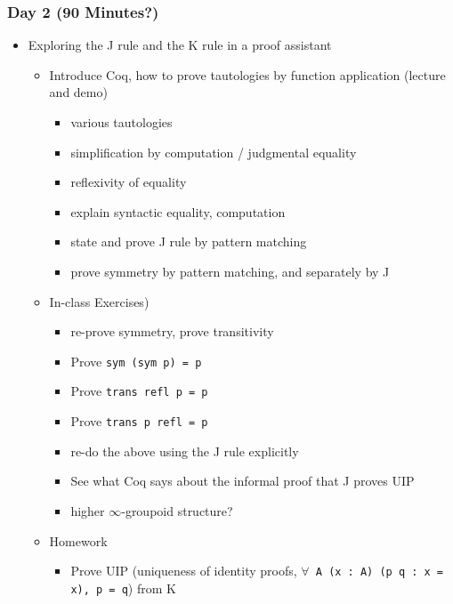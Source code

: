 \documentclass{article}
\begin{document}
\subsubsection*{Day 2 (90 Minutes?)}
\begin{itemize}
  \item Exploring the J rule and the K rule in a proof assistant
    \begin{itemize}
      \item Introduce Coq, how to prove tautologies by function application (lecture and demo)
      \begin{itemize}
        \item various tautologies
        \item simplification by computation / judgmental equality
        \item reflexivity of equality
        \item explain syntactic equality, computation
        \item state and prove J rule by pattern matching
        \item prove symmetry by pattern matching, and separately by J
      \end{itemize}
      \item In-class Exercises)
      \begin{itemize}
        \item re-prove symmetry, prove transitivity
        \item Prove \texttt{sym (sym p) = p}
        \item Prove \texttt{trans refl p = p}
        \item Prove \texttt{trans p refl = p}
        \item re-do the above using the J rule explicitly
        \item See what Coq says about the informal proof that J proves UIP
        \item higher $\infty$-groupoid structure?
      \end{itemize}
      \item Homework
      \begin{itemize}
        \item Prove UIP (uniqueness of identity proofs, \texttt{$\forall$ A (x~:~A) (p q~:~x = x), p = q}) from K

\end{itemize}
\end{itemize}
\end{itemize}
\end{document}
